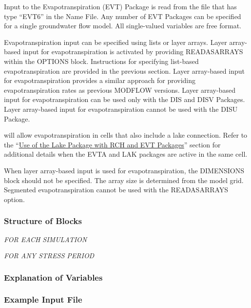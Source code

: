 Input to the Evapotranspiration (EVT) Package is read from the file that has type ``EVT6'' in the Name File. Any number of EVT Packages can be specified for a single groundwater flow model. All single-valued variables are free format.

Evapotranspiration input can be specified using lists or layer arrays.  Layer array-based input for evapotranspiration is activated by providing READASARRAYS within the OPTIONS block.   Instructions for specifying list-based evapotranspiration are provided in the previous section.  Layer array-based input for evapotranspiration provides a similar approach for providing evapotranspiration rates as previous MODFLOW versions.  Layer array-based input for evapotranspiration can be used only with the DIS and DISV Packages.  Layer array-based input for evapotranspiration cannot be used with the DISU Package.

\mf will allow evapotranspiration in cells that also include a lake connection.  Refer to the ``\hyperref[sec:lakrchet]{Use of the Lake Package with RCH and EVT Packages}'' section for additional details when the EVTA and LAK packages are active in the same cell.

When layer array-based input is used for evapotranspiration, the DIMENSIONS block should not be specified.  The array size is determined from the model grid.   Segmented evapotranspiration cannot be used with the READASARRAYS option.

\vspace{5mm}
\subsubsection{Structure of Blocks}
\vspace{5mm}

\noindent \textit{FOR EACH SIMULATION}

\vspace{5mm}
\noindent \textit{FOR ANY STRESS PERIOD}


\vspace{5mm}
\subsubsection{Explanation of Variables}
\begin{description}

\end{description}

\vspace{5mm}
\subsubsection{Example Input File}

